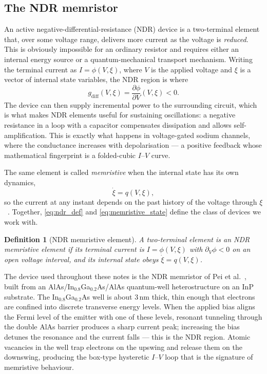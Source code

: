 \documentclass[11pt]{article}
\newtheorem{definition}{Definition}
\begin{document}
\subsection{The NDR memristor}

An active negative-differential-resistance (NDR) device is a
two-terminal element that, over some voltage range, delivers more
current as the voltage is \emph{reduced}. This is obviously impossible
for an ordinary resistor and requires either an internal energy source
or a quantum-mechanical transport mechanism. Writing the terminal
current as $I = \phi(V,\xi)$, where $V$ is the applied voltage and
$\xi$ is a vector of internal state variables, the NDR region is where
\begin{equation}
  g_{\mathrm{diff}}(V,\xi)
  =
  \frac{\partial \phi}{\partial V}(V,\xi) < 0.
  \label{eq:ndr_def}
\end{equation}
The device can then supply incremental power to the surrounding circuit,
which is what makes NDR elements useful for sustaining oscillations: a
negative resistance in a loop with a capacitor compensates dissipation
and allows self-amplification. This is exactly what happens in
voltage-gated sodium channels, where the conductance increases with
depolarisation --- a positive feedback whose mathematical fingerprint is
a folded-cubic $I$--$V$ curve.

The same element is called \emph{memristive} when the internal state
has its own dynamics,
\begin{equation}
  \dot\xi = q(V,\xi),
  \label{eq:memristive_state}
\end{equation}
so the current at any instant depends on the past history of the voltage
through $\xi$~\cite{strukov2008}. Together, \eqref{eq:ndr_def} and
\eqref{eq:memristive_state} define the class of devices we work with.

\begin{definition}[NDR memristive element]
  A two-terminal element is an \emph{NDR memristive element} if its
  terminal current is $I = \phi(V,\xi)$ with $\partial_V\phi < 0$ on
  an open voltage interval, and its internal state obeys
  $\dot\xi = q(V,\xi)$.
\end{definition}

The device used throughout these notes is the NDR memristor of Pei et
al.~\cite{pei2025}, built from an
AlAs/In$_{0.8}$Ga$_{0.2}$As/AlAs quantum-well heterostructure on an
InP substrate. The In$_{0.8}$Ga$_{0.2}$As well is about $3$\,nm thick,
thin enough that electrons are confined into discrete transverse energy
levels. When the applied bias aligns the Fermi level of the emitter
with one of these levels, resonant tunneling through the double AlAs
barrier produces a sharp current peak; increasing the bias detunes the
resonance and the current falls --- this is the NDR region. Atomic
vacancies in the well trap electrons on the upswing and release them on
the downswing, producing the box-type hysteretic $I$--$V$ loop that is
the signature of memristive behaviour.
\end{document}
